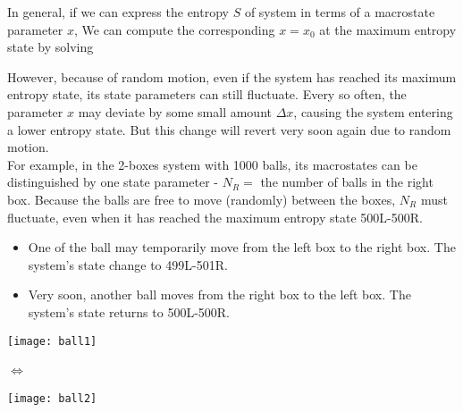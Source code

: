 \documentclass[class=article, crop=false, 12pt]{standalone}
\begin{document}
In general, if we can express the entropy $S$ of system in terms of a macrostate parameter $x$,
We can compute the corresponding $x=x_0$ at the maximum entropy state by solving

However, because of random motion, 
even if the system has reached its maximum entropy state,
its state parameters can still fluctuate.
Every so often, the parameter $x$ may deviate by some small amount $\Delta x$, 
causing the system entering a lower entropy state. 
But this change will revert very soon again due to random motion.\\

For example, in the 2-boxes system with 1000 balls, 
its macrostates can be distinguished by one state parameter - 
$N_R=$ the number of balls in the right box. 
Because the balls are free to move (randomly) between the boxes, 
$N_R$ must fluctuate, even when it has reached the maximum entropy state 500L-500R. 
\begin{itemize}
    \item
    One of the ball may temporarily move from the left box to the right box.
    The system's state change to 499L-501R. 

    \item Very soon, another ball moves from the right box to the left box.
    The system's state returns to 500L-500R.
\end{itemize}

\begin{center}
    \begin{minipage}{0.3\linewidth}
        \centering
        \texttt{[image: ball1]}
    \end{minipage}
    \quad$\Leftrightarrow$\quad\ 
    \begin{minipage}{0.3\linewidth}
        \centering
        \texttt{[image: ball2]}
    \end{minipage}
\end{center}
\end{document}
